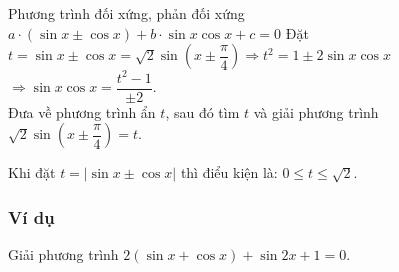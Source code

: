 
\begin{dang}{Phương trình đối xứng, phản đối xứng $a\cdot \left(\sin x \pm \cos x\right)+b\cdot \sin x\cos x +c=0$}
	Đặt $t=\sin x \pm \cos x=\sqrt{2}\sin\left(x\pm \dfrac{\pi}{4}\right) \Rightarrow t^2=1\pm 2\sin x \cos x$  $\Rightarrow \sin x\cos x=\dfrac{t^2-1}{\pm 2}$.\\
	Đưa về phương trình ẩn $t$, sau đó tìm $t$ và giải phương trình  $\sqrt{2}\sin\left(x\pm \dfrac{\pi}{4}\right)=t$.
	\begin{note}
		Khi đặt $t=\left | \sin x \pm \cos x \right |$ thì điểu kiện là: $0\leq t\leq \sqrt{2}$.
	\end{note}
\end{dang}
\subsubsection{Ví dụ}
\begin{vd}%
	Giải phương trình $2(\sin x+\cos x)+\sin 2 x+1=0$.
\end{vd}

